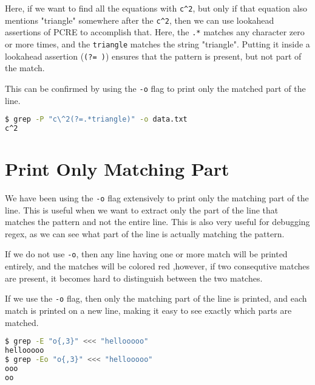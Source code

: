 Here, if we want to find all the equations with \lstinline|c^2|, but only if that equation also mentions "triangle" somewhere after the \lstinline|c^2|, then we can use lookahead assertions of PCRE to accomplish that.
Here, the \lstinline|.*| matches any character zero or more times, and the \lstinline|triangle| matches the string "triangle".
Putting it inside a lookahead assertion (\lstinline|(?= )|) ensures that the pattern is present, but not part of the match.

This can be confirmed by using the \lstinline|-o| flag to print only the matched part of the line.

\begin{lstlisting}[language=bash]
$ grep -P "c\^2(?=.*triangle)" -o data.txt
c^2
\end{lstlisting}

\section{Print Only Matching Part}

We have been using the \lstinline|-o| flag extensively to print only the matching part of the line. This is useful when we want to extract only the part of the line that matches the pattern and not the entire line.
This is also very useful for debugging regex, as we can see what part of the line is actually matching the pattern.

If we do not use \lstinline|-o|, then any line having one or more match will be printed entirely, and the matches will be colored red
,however, if two consequtive matches are present, it becomes hard to distinguish between the two matches.

If we use the \lstinline|-o| flag, then only the matching part of the line is printed, and each match is printed on a new line, making it easy to see exactly which parts are matched.

\begin{lstlisting}[language=bash]
$ grep -E "o{,3}" <<< "hellooooo"
hellooooo
$ grep -Eo "o{,3}" <<< "hellooooo"
ooo
oo
\end{lstlisting}

